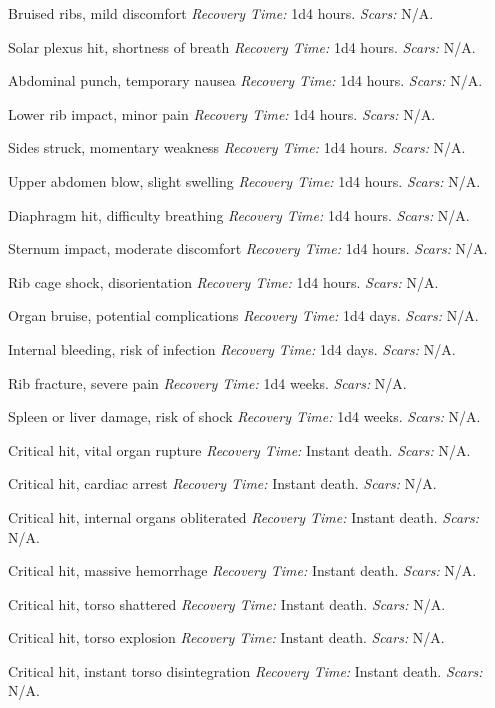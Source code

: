 \begin{description}[labelwidth=1.5em, leftmargin=*, itemsep=0.4em]
    \item[1 -] Bruised ribs, mild discomfort \textit{Recovery Time:} 1d4 hours. \textit{Scars:} N/A.
    \item[2 -] Solar plexus hit, shortness of breath \textit{Recovery Time:} 1d4 hours. \textit{Scars:} N/A.
    \item[3 -] Abdominal punch, temporary nausea \textit{Recovery Time:} 1d4 hours. \textit{Scars:} N/A.
    \item[4 -] Lower rib impact, minor pain \textit{Recovery Time:} 1d4 hours. \textit{Scars:} N/A.
    \item[5 -] Sides struck, momentary weakness \textit{Recovery Time:} 1d4 hours. \textit{Scars:} N/A.
    \item[6 -] Upper abdomen blow, slight swelling \textit{Recovery Time:} 1d4 hours. \textit{Scars:} N/A.
    \item[7 -] Diaphragm hit, difficulty breathing \textit{Recovery Time:} 1d4 hours. \textit{Scars:} N/A.
    \item[8 -] Sternum impact, moderate discomfort \textit{Recovery Time:} 1d4 hours. \textit{Scars:} N/A.
    \item[9 -] Rib cage shock, disorientation \textit{Recovery Time:} 1d4 hours. \textit{Scars:} N/A.
    \item[10 -] Organ bruise, potential complications \textit{Recovery Time:} 1d4 days. \textit{Scars:} N/A.
    \item[11 -] Internal bleeding, risk of infection \textit{Recovery Time:} 1d4 days. \textit{Scars:} N/A.
    \item[12 -] Rib fracture, severe pain \textit{Recovery Time:} 1d4 weeks. \textit{Scars:} N/A.
    \item[13 -] Spleen or liver damage, risk of shock \textit{Recovery Time:} 1d4 weeks. \textit{Scars:} N/A.
    \item[14 -] Critical hit, vital organ rupture \textit{Recovery Time:} Instant death. \textit{Scars:} N/A.
    \item[15 -] Critical hit, cardiac arrest \textit{Recovery Time:} Instant death. \textit{Scars:} N/A.
    \item[16 -] Critical hit, internal organs obliterated \textit{Recovery Time:} Instant death. \textit{Scars:} N/A.
    \item[17 -] Critical hit, massive hemorrhage \textit{Recovery Time:} Instant death. \textit{Scars:} N/A.
    \item[18 -] Critical hit, torso shattered \textit{Recovery Time:} Instant death. \textit{Scars:} N/A.
    \item[19 -] Critical hit, torso explosion \textit{Recovery Time:} Instant death. \textit{Scars:} N/A.
    \item[20 -] Critical hit, instant torso disintegration \textit{Recovery Time:} Instant death. \textit{Scars:} N/A.
\end{description}

